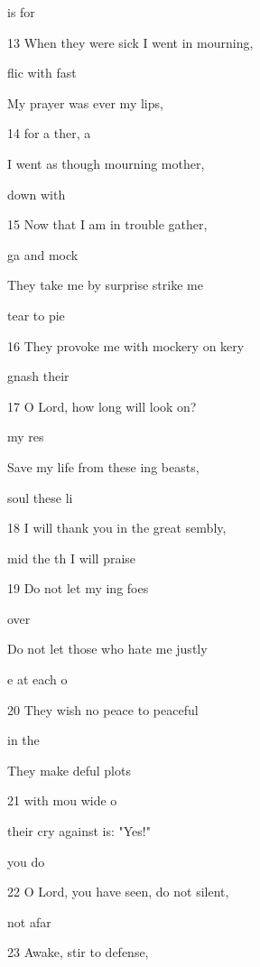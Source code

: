   is for 

13 When they were sick I went in mourning, 

flic with fast 

My prayer was ever  my lips, 

14  for a ther, a  

I went as though mourning  mother, 

  down with  

15 Now that I am in trouble  gather, 

 ga and mock  

They take me by surprise  strike me 

 tear  to pie 

16 They provoke me with mockery on kery 

  gnash their  

17 O Lord, how long will  look on? 

  my res 

Save my life from these ing beasts, 

 soul  these li 

18 I will thank you in the great sembly, 

mid the th I will praise  

19 Do not let my ing foes 

 over  

Do not let those who hate me justly 

 e at each o 

20 They wish no peace to  peaceful 

  in the  

They make deful plots 

21  with mou wide o 

their cry against  is: "Yes!" 

  you do  

22 O Lord, you have seen, do not  silent, 

 not  afar  

23 Awake, stir to  defense, 

